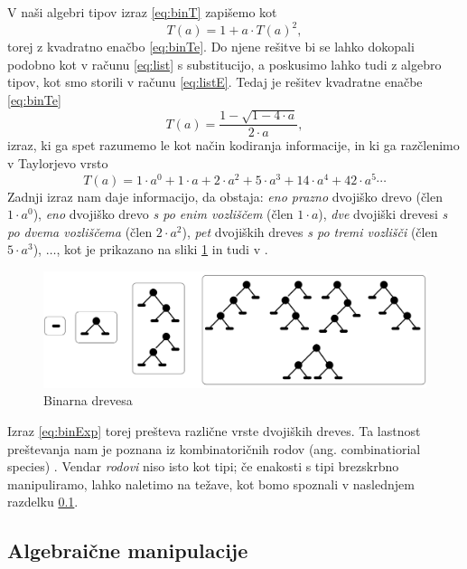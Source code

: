 \documentclass[a4paper, 12pt]{book}
\begin{document}
\noindent V naši algebri tipov izraz \eqref{eq:binT} zapišemo kot
\begin{equation}
\label{eq:binTe}
T(a)=1+a\cdot T(a)^2,
\end{equation}
torej z kvadratno enačbo \eqref{eq:binTe}. Do njene rešitve bi se lahko dokopali podobno kot v računu \eqref{eq:list} s substitucijo, a poskusimo lahko tudi z algebro tipov, kot smo storili v računu \eqref{eq:listE}. Tedaj je rešitev kvadratne enačbe \eqref{eq:binTe}
\begin{equation}
T(a)=\frac{1-\sqrt{1-4\cdot a}}{2\cdot a}, \label{eq:binTeQ}
\end{equation}
izraz, ki ga spet razumemo le kot način kodiranja informacije, in ki ga razčlenimo v Taylorjevo vrsto
\begin{equation}
T(a)=1\cdot a^0+1\cdot a+2\cdot a^2 + 5\cdot a^3+ 14\cdot a^4 + 42\cdot a^5\cdots \label{eq:binExp}
\end{equation}
Zadnji izraz nam daje informacijo, da obstaja: \emph{eno prazno} dvojiško drevo (člen $1\cdot a^0$), \emph{eno} dvojiško drevo \emph{s po enim vozliščem} (člen $1\cdot a$), \emph{dve} dvojiški drevesi \emph{s po dvema vozliščema} (člen $2\cdot a^2$), \emph{pet} dvojiških dreves \emph{s po tremi vozlišči} (člen $5\cdot a^3$), $\dots$, kot je prikazano na sliki \ref{fig:trees} in tudi v \cite{analComb}.
\begin{figure}
\begin{center}
\includegraphics[width=\linewidth]{imgs/bintrees.png}
\end{center}
\caption{Binarna drevesa}
\label{fig:trees}
\end{figure}

Izraz \eqref{eq:binExp} torej prešteva različne vrste dvojiških dreves. Ta lastnost preštevanja nam je poznana iz kombinatoričnih rodov (ang. combinatiorial species) \cite{species}. Vendar \emph{rodovi} niso isto kot tipi; če enakosti s tipi brezskrbno manipuliramo, lahko naletimo na težave, kot bomo spoznali v naslednjem razdelku \ref{ch:algMani}.


\subsection{Algebraične manipulacije}\label{ch:algMani}
\end{document}
